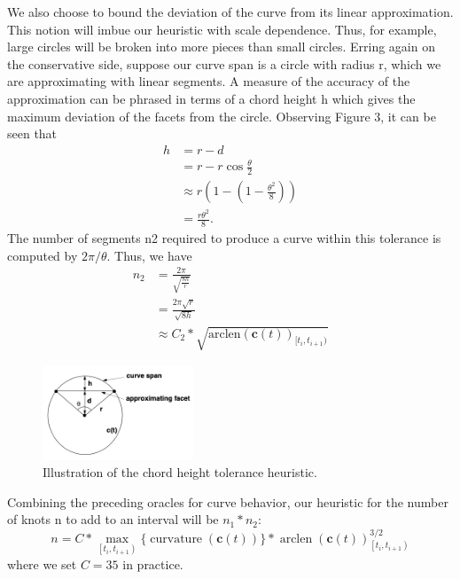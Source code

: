\documentclass[acmtog]{acmart}
\begin{document}
We also choose to bound the deviation of the curve from its linear approximation. This notion will imbue our heuristic with scale dependence. Thus, for example, large circles will be broken into more pieces than small circles. Erring again on the conservative side, suppose our curve span is a circle with radius r, which we are approximating with linear segments. A measure of the accuracy of the approximation can be phrased in terms of a chord height h which gives the maximum deviation of the facets from the circle. Observing Figure 3, it can be seen that
\[
    \begin{aligned}
        h & =r-d \\
        & =r-r \cos \frac{\theta}{2} \\
        & \approx r\left(1-\left(1-\frac{\theta^2}{8}\right)\right) \\
        & =\frac{r \theta^2}{8} .
    \end{aligned}
\]
The number of segments n2 required to produce a curve within this tolerance is computed by $2\pi/\theta$. Thus, we have
\[
    \begin{aligned}
        n_2 &=\frac{2 \pi}{\sqrt{\frac{8 h}{r}}} \\
        & =\frac{2 \pi \sqrt{r}}{\sqrt{8 h}} \\
        & \approx C_2 * \sqrt{\mathrm{arclen}(\mathbf{c}(t))_{[t_i, t_{i+1})}}
    \end{aligned}
\]
\begin{figure}
    \centering
    \includegraphics[width=0.4\textwidth]{heu.png}
    \caption{Illustration of the chord height tolerance heuristic.}
\end{figure}

Combining the preceding oracles for curve behavior, our heuristic for the number of knots n to add to an interval will be $n_1*n_2$:
\[
    n=C * \max _{\left[t_i, t_{i+1}\right)}\{\operatorname{curvature}(\mathbf{c}(t))\} * \operatorname{arclen}(\mathbf{c}(t))_{\left[t_i, t_{i+1}\right)}^{3 / 2}
\]
where we set $C=35$ in practice.
\end{document}
